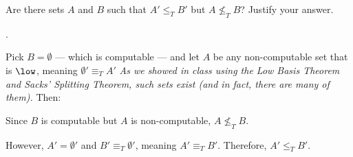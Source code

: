 \begin{problem}
  Are there sets $A$ and $B$ such that $A' \leq_T B'$
  but $A \not\leq_T B$?
  Justify your answer.

  \begin{answer}
    .

    Pick $B = \emptyset$ --- which is computable ---
    and let $A$ be any non-computable set that is $\low$,
    meaning $\emptyset' \equiv_T A'$
    \emph{
      As we showed in class using
      the Low Basis Theorem and Sacks' Splitting Theorem,
      such sets exist (and in fact, there are many of them).
    }
    Then:
    \begin{enumarabic}
      \item Since $B$ is computable but $A$ is non-computable,
        $A \not\leq_T B$.
      \item However, $A' = \emptyset'$ and $B' \equiv_T \emptyset'$,
        meaning $A' \equiv_T B'$.
        Therefore, $A' \leq_T B'$.
    \end{enumarabic}
  \end{answer}
\end{problem}
